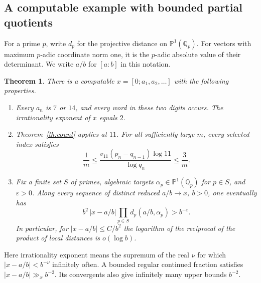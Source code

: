 \documentclass[11pt,a4paper]{article}
\newcommand{\Q}{\mathbb Q}\newcommand{\Z}{\mathbb Z}\newcommand{\PP}{\mathbb P}\newcommand{\SL}{\mathrm{SL}}
\newtheorem{theorem}{Theorem}[section]
\begin{document}
\subsection{A computable example with bounded partial quotients}
For a prime \(p\), write \(d_p\) for the projective distance on \(\PP^1(\Q_p)\). For vectors with maximum \(p\)-adic coordinate norm one, it is the \(p\)-adic absolute value of their determinant. We write \(a/b\) for \([a:b]\) in this notation.
\begin{theorem}\label{th:example}
There is a computable \(x=[0;a_1,a_2,\ldots]\) with the following properties.
\begin{enumerate}
\item Every \(a_n\) is \(7\) or \(14\), and every word in these two digits occurs. The irrationality exponent of \(x\) equals \(2\).
\item Theorem~\ref{th:count} applies at \(11\). For all sufficiently large \(m\), every selected index satisfies
\[
 \frac1m\le\frac{v_{11}(p_n-q_{n-1})\log 11}{\log q_n}\le\frac3m.
\]
\item Fix a finite set \(S\) of primes, algebraic targets \(\alpha_p\in\PP^1(\Q_p)\) for \(p\in S\), and \(\varepsilon>0\). Along every sequence of distinct reduced \(a/b\to x\), \(b>0\), one eventually has
\[
 b^2\,|x-a/b|\prod_{p\in S}d_p(a/b,\alpha_p)>b^{-\varepsilon}.
\]
In particular, for \(|x-a/b|\le C/b^2\) the logarithm of the reciprocal of the product of local distances is \(o(\log b)\).
\end{enumerate}
\end{theorem}
Here irrationality exponent means the supremum of the real \(\nu\) for which \(|x-a/b|<b^{-\nu}\) infinitely often. A bounded regular continued fraction satisfies \(|x-a/b|\gg_x b^{-2}\). Its convergents also give infinitely many upper bounds \(b^{-2}\).
\end{document}

